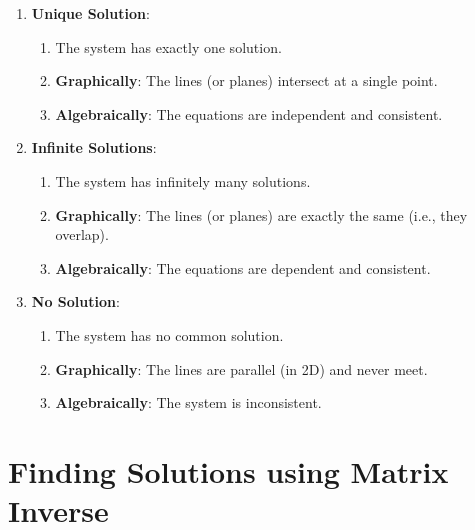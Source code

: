 \begin{enumerate}

\item \textbf{Unique Solution}:
\begin{enumerate}
    \item The system has exactly one solution.
    \hfill \cite{common/online/chatgpt}

    \item \textbf{Graphically}: The lines (or planes) intersect at a single point.
    \hfill \cite{common/online/chatgpt}

    \item \textbf{Algebraically}: The equations are independent and consistent.
    \hfill \cite{common/online/chatgpt}
\end{enumerate}

\item \textbf{Infinite Solutions}:
\begin{enumerate}
    \item The system has infinitely many solutions.
    \hfill \cite{common/online/chatgpt}

    \item \textbf{Graphically}: The lines (or planes) are exactly the same (i.e., they overlap).
    \hfill \cite{common/online/chatgpt}

    \item \textbf{Algebraically}: The equations are dependent and consistent.
    \hfill \cite{common/online/chatgpt}
\end{enumerate}

\item \textbf{No Solution}:
\begin{enumerate}
    \item The system has no common solution.
    \hfill \cite{common/online/chatgpt}

    \item \textbf{Graphically}: The lines are parallel (in 2D) and never meet.
    \hfill \cite{common/online/chatgpt}

    \item \textbf{Algebraically}: The system is inconsistent.
    \hfill \cite{common/online/chatgpt}
\end{enumerate}

\end{enumerate}


\section{Finding Solutions using Matrix Inverse}

